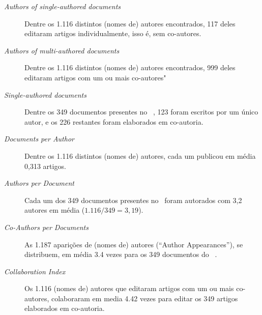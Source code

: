 \begin{description}
    \item [\textit{Authors of single-authored documents}] Dentre os 1.116 distintos (nomes de) autores encontrados, 117 deles editaram artigos individualmente, isso é, sem co-autores.
    \item [\textit{Authors of multi-authored documents}] Dentre os 1.116 distintos (nomes de) autores encontrados, 999 deles editaram artigos com um ou mais co-autores"
    \item [\textit{Single-authored documents}] Dentre os 349 documentos presentes no \dataset\  , 123 foram escritos por um único autor, e os 226 restantes foram elaborados em co-autoria.
    \item [\textit{Documents per Author}] Dentre os 1.116 distintos (nomes de) autores, cada um publicou em média 0,313 artigos.
    \item [\textit{Authors per Document}] Cada um dos 349 documentos presentes no \dataset\  foram autorados com 3,2 autores em média ($1.116 / 349 = 3,19$).
    \item [\textit{Co-Authors per Documents}] As 1.187 aparições de (nomes de) autores (``Author Appearances''), se distribuem, em média 3.4 vezes para os 349 documentos do \dataset\ .
    \item [\textit{Collaboration Index}] Os 1.116 (nomes de) autores que editaram artigos com um ou mais co-autores, colaboraram em media 4.42 vezes para editar os 349 artigos elaborados em co-autoria.
\end{description}



